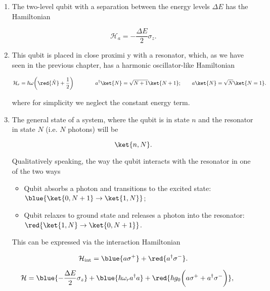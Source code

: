 \begin{enumerate}
\item The two-level qubit with a separation between the energy levels
  $ \Delta E $ has the Hamiltonian

\begin{equation}
  \mathcal{H}_{a}= -\frac{\Delta E}{2}\sigma_z.
  \label{qrA}
\end{equation}

\item  This qubit  is placed  in close  proximi y  with a  resonator,
  which, as  we have  seen in  the previous  chapter, has  a harmonic
  oscillator-like Hamiltonian

\begin{equation}
  \mathcal{H}_{r}={\hbar\omega}\bigg(\red{\hat{N}}+\frac{1}{2}\bigg)\qquad \qquad a^{\dagger}\ket{N}=\sqrt{N+1}\ket{N+1}; \qquad a\ket{N}=\sqrt{N}\ket{N=1}.
  \label{qrR}
\end{equation}

\noindent where for simplicity we neglect the constant energy term.

\item The  general state  of a  system, where the  qubit is  in state
  $ n $ and  the resonator in state $ N $ (i.e.   $ N $ photons) will
  be

\begin{equation}
  \ket{n,N}.
\end{equation}

\noindent Qualitatively  speaking, the  way the qubit  interacts with
the resonator in one of the two ways

\begin{itemize}
\item Qubit  absorbs a photon  and transitions to the  excited state:
  $ \blue{\ket{0,N+1} \rightarrow \ket{1,N}} $;
\item Qubit  relaxes to ground state  and releases a photon  into the
  resonator: $ \red{\ket{1,N} \rightarrow \ket{0,N+1}} $.
\end{itemize}

This can be expressed via the interaction Hamiltonian

\begin{equation}
  \mathcal{H}_{\text{int}}=\blue{a\sigma^+}+\red{a^{\dagger}\sigma^-}.
  \label{qrInt}
\end{equation}
\end{enumerate}
\begin{framed}\noindent
  \LARGE
  \[                 \mathcal{H}                 =\blue{-\frac{\Delta
        E}{2}\sigma_z}+\blue{{\hbar\omega_r}a^\dagger a} + \red{\hbar
      g_0\bigg({a\sigma^+}+{a^{\dagger}\sigma^-}\bigg)},
  \]
\end{framed}

